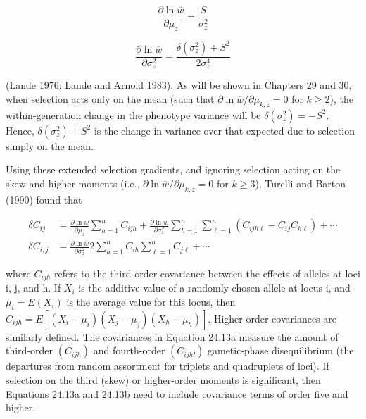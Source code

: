 \documentclass{article}
\begin{document}
\begin{equation}
\frac{\partial\ln\overline{w}}{\partial\mu_{z}}=\frac{S}{\sigma_{z}^{2}}
\tag{24.12a}
\label{eq:24_12a}
\end{equation}

\begin{equation}
\frac{\partial\ln\overline{w}}{\partial\sigma_{z}^{2}}=\frac{\delta(\sigma_{z}^{2})+S^{2}}{2\sigma_{z}^{4}}
\tag{24.12b}
\label{eq:24_12b}
\end{equation}

(Lande 1976; Lande and Arnold 1983). As will be shown in Chapters 29 and 30, when selection acts only on the mean (such that  $ \partial \ln \overline{w}/\partial \mu_{k,z} = 0 $ for  $ k \geq 2 $), the within-generation change in the phenotype variance will be  $ \delta(\sigma_z^2) = -S^2 $. Hence,  $ \delta(\sigma_z^2) + S^2 $ is the change in variance over that expected due to selection simply on the mean.

Using these extended selection gradients, and ignoring selection acting on the skew and higher moments (i.e.,  $ \partial \ln \overline{w} / \partial \mu_{k,z} = 0 $ for  $ k \geq 3 $), Turelli and Barton (1990) found that

\begin{equation}
\begin{aligned}\delta C_{ij}&=\frac{\partial\ln\overline{w}}{\partial\mu_{z}}\sum_{h=1}^{n}C_{ijh}+\frac{\partial\ln\overline{w}}{\partial\sigma_{z}^{2}}\sum_{h=1}^{n}\sum_{\ell=1}^{n}(C_{ijh\ell}-C_{ij}C_{h\ell})+\cdots\\\delta C_{i,j}&=\frac{\partial\ln\overline{w}}{\partial\sigma_{z}^{2}}2\sum_{h=1}^{n}C_{ih}\sum_{\ell=1}^{n}C_{j\ell}+\cdots\end{aligned}
\tag{24.13a}
\label{eq:24_13a}
\end{equation}

where  $ C_{ijh} $ refers to the third-order covariance between the effects of alleles at loci i, j, and h. If  $ X_i $ is the additive value of a randomly chosen allele at locus i, and  $ \mu_i = E(X_i) $ is the average value for this locus, then  $ C_{ijh} = E[(X_i - \mu_i)(X_j - \mu_j)(X_h - \mu_h)] $. Higher-order covariances are similarly defined. The covariances in Equation 24.13a measure the amount of third-order  $ (C_{ijh}) $ and fourth-order  $ (C_{ijhl}) $ gametic-phase disequilibrium (the departures from random assortment for triplets and quadruplets of loci). If selection on the third (skew) or higher-order moments is significant, then Equations 24.13a and 24.13b need to include covariance terms of order five and higher.
\end{document}
